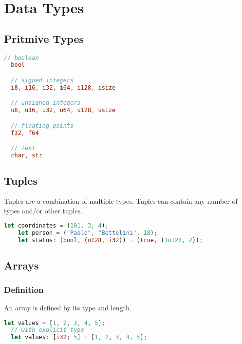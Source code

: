 \documentclass[a4paper]{article}
\author{Paolo Bettelini}
\date{}
\begin{document}
\maketitle
\tableofcontents
\pagebreak

\section{Data Types}

\subsection{Pritmive Types}

\begin{lstlisting}[language=Rust, style=boxed, numbers=none]
  // boolean
  bool

  // signed integers
  i8, i16, i32, i64, i128, isize

  // unsigned integers
  u8, u16, u32, u64, u128, usize

  // floating points
  f32, f64

  // Text
  char, str
\end{lstlisting}

\subsection{Tuples}

Tuples are a combination of multiple types.
Tuples can contain any number of types and/or other tuples.

\begin{lstlisting}[language=Rust, style=boxed, numbers=none]
    let coordinates = (101, 3, 4);
    let person = ("Paolo", "Bettelini", 18);
    let status: (bool, (u128, i32)) = (true, (1u128, 2));
\end{lstlisting}

\subsection{Arrays}

\subsubsection{Definition}

An array is defined by its type and length.

\begin{lstlisting}[language=Rust, style=boxed, numbers=none]
  let values = [1, 2, 3, 4, 5];
  // with explicit type
  let values: [i32; 5] = [1, 2, 3, 4, 5];
\end{lstlisting}
\end{document}
